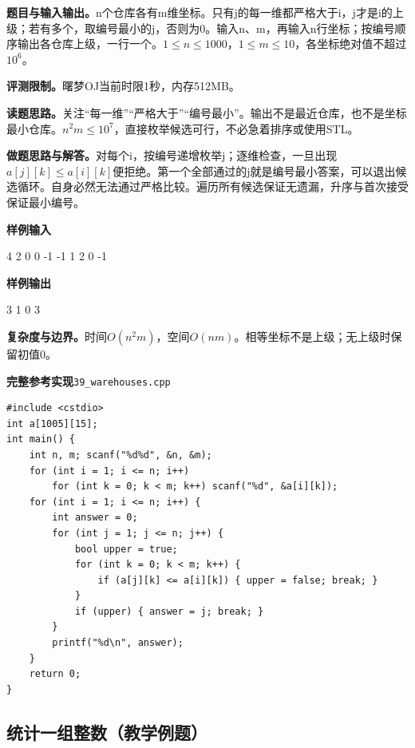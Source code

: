 \documentclass[UTF8,11pt,a4paper,fontset=none]{ctexart}
\begin{document}
\noindent\textbf{题目与输入输出。}n个仓库各有m维坐标。只有j的每一维都严格大于i，j才是i的上级；若有多个，取编号最小的j，否则为0。输入n、m，再输入n行坐标；按编号顺序输出各仓库上级，一行一个。$1\le n\le1000$，$1\le m\le10$，各坐标绝对值不超过$10^6$。

\noindent\textbf{评测限制。}曙梦OJ当前时限1秒，内存512MB。

\noindent\textbf{读题思路。}关注“每一维”“严格大于”“编号最小”。输出不是最近仓库，也不是坐标最小仓库。$n^2m\le10^7$，直接枚举候选可行，不必急着排序或使用STL。

\noindent\textbf{做题思路与解答。}对每个i，按编号递增枚举j；逐维检查，一旦出现$a[j][k]\le a[i][k]$便拒绝。第一个全部通过的j就是编号最小答案，可以退出候选循环。自身必然无法通过严格比较。遍历所有候选保证无遗漏，升序与首次接受保证最小编号。
\begin{tcolorbox}[samplebox,title={输入输出样例}]
\textbf{样例输入}
\begin{Sample}
4 2
0 0
-1 -1
1 2
0 -1
\end{Sample}
\tcblower
\textbf{样例输出}
\begin{Sample}
3
1
0
3
\end{Sample}
\end{tcolorbox}

\noindent\textbf{复杂度与边界。}时间$O(n^2m)$，空间$O(nm)$。相等坐标不是上级；无上级时保留初值0。
\par\noindent\begin{minipage}{\linewidth}
\textbf{完整参考实现}\quad\texttt{39\_warehouses.cpp}
\begin{lstlisting}
#include <cstdio>
int a[1005][15];
int main() {
    int n, m; scanf("%d%d", &n, &m);
    for (int i = 1; i <= n; i++)
        for (int k = 0; k < m; k++) scanf("%d", &a[i][k]);
    for (int i = 1; i <= n; i++) {
        int answer = 0;
        for (int j = 1; j <= n; j++) {
            bool upper = true;
            for (int k = 0; k < m; k++) {
                if (a[j][k] <= a[i][k]) { upper = false; break; }
            }
            if (upper) { answer = j; break; }
        }
        printf("%d\n", answer);
    }
    return 0;
}
\end{lstlisting}
\end{minipage}\par

\subsection{统计一组整数（教学例题）}
\end{document}
